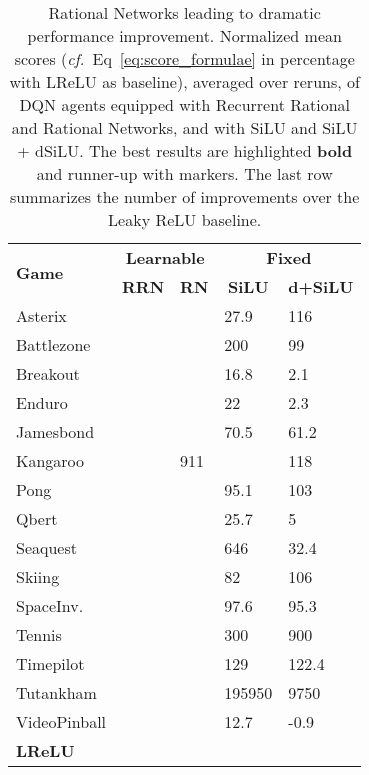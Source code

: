 \documentclass{article}
\newcommand{\cf}{\emph{cf.}~}
\begin{document}
\begin{table}[t]
\centering
{\def\arraystretch{1.15}\tabcolsep=4.5pt
\begin{tabular}{|l|l|l|l|l|}
\hline
\multirow{2}{*}{\textbf{Game}} & \multicolumn{2}{c|}{\textbf{Learnable}} & \multicolumn{2}{c|}{\textbf{Fixed}}   \\ \cline{2-5} 
& \multicolumn{1}{c|}{\textbf{RRN}} & \multicolumn{1}{c|}{\textbf{RN}}    & \multicolumn{1}{c|}{\textbf{SiLU}}       & \multicolumn{1}{c|}{\textbf{d+SiLU}} \\ 
\hline
Asterix      &             &     & 27.9      & 116    \\ \hline
Battlezone   &      &            & 200           & 99     \\ \hline
Breakout     &      &            & 16.8          & 2.1    \\ \hline
Enduro       &    &       & 22            & 2.3    \\ \hline
Jamesbond    &     &    & 70.5          & 61.2   \\ \hline
Kangaroo     &     & 911           &    & 118    \\ \hline
Pong         & &  & 95.1          & 103    \\ \hline
Qbert        &    &       & 25.7          & 5      \\ \hline
Seaquest     &     &    & 646           & 32.4   \\ \hline
Skiing       &    &       & 82            & 106    \\ \hline
SpaceInv.    &      &     & 97.6          & 95.3   \\ \hline
Tennis       &     &    & 300           & 900    \\ \hline
Timepilot    &   &      & 129           & 122.4  \\ \hline
Tutankham    &   &  & 195950        & 9750   \\ \hline
VideoPinball &    &       & 12.7          & -0.9   \\ \hline\hline
\textbf{ LReLU}&        &       &              &  \\ \hline
\end{tabular}
}
\caption{Rational Networks leading to dramatic performance improvement. Normalized mean scores (\cf Eq~\ref{eq:score_formulae} in percentage with LReLU as baseline), averaged over  reruns, of DQN agents equipped with Recurrent Rational and Rational Networks, and with SiLU and SiLU + dSiLU. The best results are highlighted \textbf{bold} and runner-up with  markers. The last row summarizes the number of improvements over the Leaky ReLU baseline.}
\label{tab:lrelu_normalized_scores}
\end{table}
\end{document}
